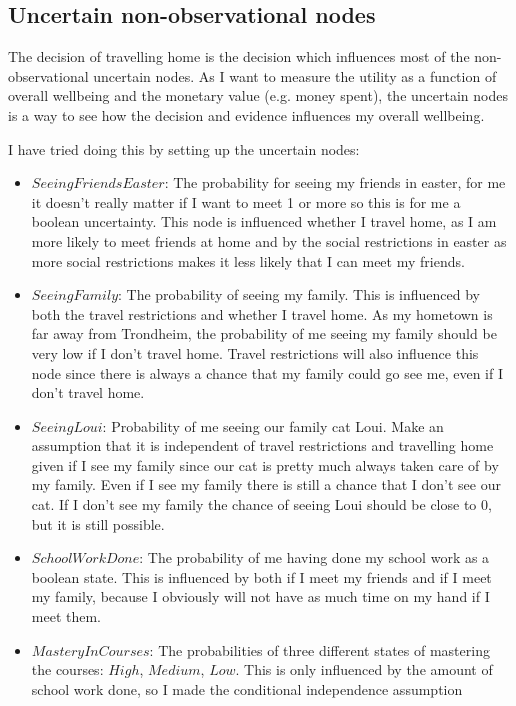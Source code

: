 \documentclass[11pt, a4paper, english]{../Template/NTNUoving}
\begin{document}
\begin{oppgave}
    \subsection{Uncertain non-observational nodes}
    The decision of travelling home is the decision which influences most of the non-observational uncertain nodes.
    As I want to measure the utility as a function of overall wellbeing and the monetary value (e.g. money spent), the uncertain nodes
    is a way to see how the decision and evidence influences my overall wellbeing.

    I have tried doing this by setting up the uncertain nodes:
    \begin{itemize}
        \item $SeeingFriendsEaster$: The probability for seeing my friends in easter, for me it doesn't really matter if I want to meet 1
        or more so this is for me a boolean uncertainty. This node is influenced whether I travel home, as I am more likely to meet friends at home and by the
        social restrictions in easter as more social restrictions makes it less likely that I can meet my friends.
        \item $SeeingFamily$: The probability of seeing my family. This is influenced by both the travel restrictions and whether I travel home.
        As my hometown is far away from Trondheim, the probability of me seeing my family should be very low if I don't travel home. Travel restrictions will also influence this node since there
        is always a chance that my family could go see me, even if I don't travel home.
        \item $SeeingLoui$: Probability of me seeing our family cat Loui. Make an assumption that it is independent of travel restrictions and travelling home given if I see my family since our cat is pretty much always taken care of by my family.
        Even if I see my family there is still a chance that I don't see our cat. If I don't see my family the chance of seeing Loui should be close to 0, but it is still possible.
        \item $SchoolWorkDone$: The probability of me having done my school work as a boolean state. This is influenced by both if I meet my friends and if I meet my family, because I obviously
        will not have as much time on my hand if I meet them.
        \item $MasteryInCourses$: The probabilities of three different states of mastering the courses: $High$, $Medium$, $Low$. This is only influenced by the amount of school work done, so I made the conditional independence assumption

\end{itemize}
\end{oppgave}
\end{document}
